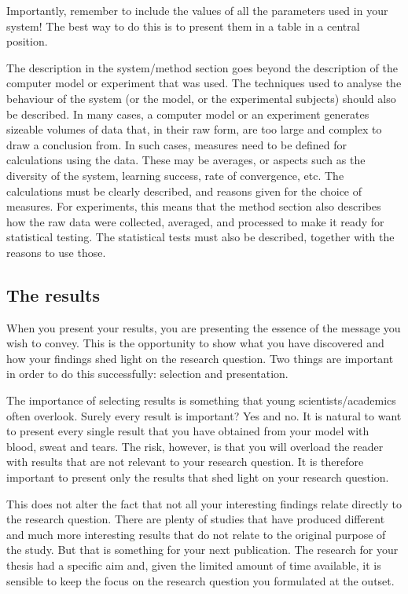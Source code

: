 Importantly, remember to include the values of all the parameters used in your system! The best way to do this is to present them in a table in a central position.

The description in the system/method section goes beyond the description of the computer model or experiment that was used. The techniques used to analyse the behaviour of the system (or the model, or the experimental subjects) should also be described. In many cases, a computer model or an experiment generates sizeable volumes of data that, in their raw form, are too large and complex to draw a conclusion from. In such cases, measures need to be defined for calculations using the data. These may be averages, or aspects such as the diversity of the system, learning success, rate of convergence, etc. The calculations must be clearly described, and reasons given for the choice of measures. For experiments, this means that the method section also describes how the raw data were collected, averaged, and processed to make it ready for statistical testing. The statistical tests must also be described, together with the reasons to use those.

\subsection{The results}\label{sec:_the_results}
When you present your results, you are presenting the essence of the message you wish to convey. This is the opportunity to show what you have discovered and how your findings shed light on the research question. Two things are important in order to do this successfully: selection and presentation.

The importance of selecting results is something that young scientists/academics often overlook. Surely every result is important? Yes and no. It is natural to want to present every single result that  you have obtained from your model with blood, sweat and tears. The risk, however, is that you will overload the reader with results that are not relevant to your research question. It is therefore important to present only the results that shed light on your research question. 

This does not alter the fact that not all your interesting findings relate directly to the research question. There are plenty of studies that have produced different and much more interesting results that do not relate to the original purpose of the study. But that is something for your next publication. The research for your thesis had a specific aim and, given the limited amount of time available, it is sensible to keep the focus on the research question you formulated at the outset.

